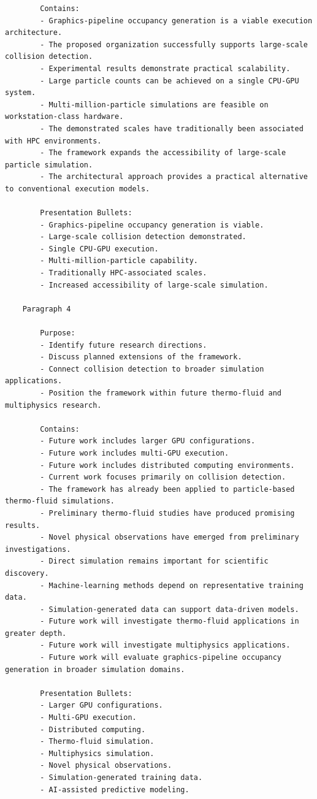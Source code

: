 \begin{verbatim}
		Contains:
		- Graphics-pipeline occupancy generation is a viable execution architecture.
		- The proposed organization successfully supports large-scale collision detection.
		- Experimental results demonstrate practical scalability.
		- Large particle counts can be achieved on a single CPU-GPU system.
		- Multi-million-particle simulations are feasible on workstation-class hardware.
		- The demonstrated scales have traditionally been associated with HPC environments.
		- The framework expands the accessibility of large-scale particle simulation.
		- The architectural approach provides a practical alternative to conventional execution models.

		Presentation Bullets:
		- Graphics-pipeline occupancy generation is viable.
		- Large-scale collision detection demonstrated.
		- Single CPU-GPU execution.
		- Multi-million-particle capability.
		- Traditionally HPC-associated scales.
		- Increased accessibility of large-scale simulation.

	Paragraph 4

		Purpose:
		- Identify future research directions.
		- Discuss planned extensions of the framework.
		- Connect collision detection to broader simulation applications.
		- Position the framework within future thermo-fluid and multiphysics research.

		Contains:
		- Future work includes larger GPU configurations.
		- Future work includes multi-GPU execution.
		- Future work includes distributed computing environments.
		- Current work focuses primarily on collision detection.
		- The framework has already been applied to particle-based thermo-fluid simulations.
		- Preliminary thermo-fluid studies have produced promising results.
		- Novel physical observations have emerged from preliminary investigations.
		- Direct simulation remains important for scientific discovery.
		- Machine-learning methods depend on representative training data.
		- Simulation-generated data can support data-driven models.
		- Future work will investigate thermo-fluid applications in greater depth.
		- Future work will investigate multiphysics applications.
		- Future work will evaluate graphics-pipeline occupancy generation in broader simulation domains.

		Presentation Bullets:
		- Larger GPU configurations.
		- Multi-GPU execution.
		- Distributed computing.
		- Thermo-fluid simulation.
		- Multiphysics simulation.
		- Novel physical observations.
		- Simulation-generated training data.
		- AI-assisted predictive modeling.




   \end{verbatim}


